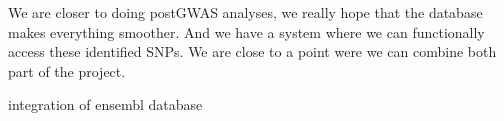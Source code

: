We are closer to doing postGWAS analyses, we really hope that the database makes everything smoother.
And we have a system where we can functionally access these identified SNPs.
We are close to a point were we can combine both part of the project.


integration of ensembl database

